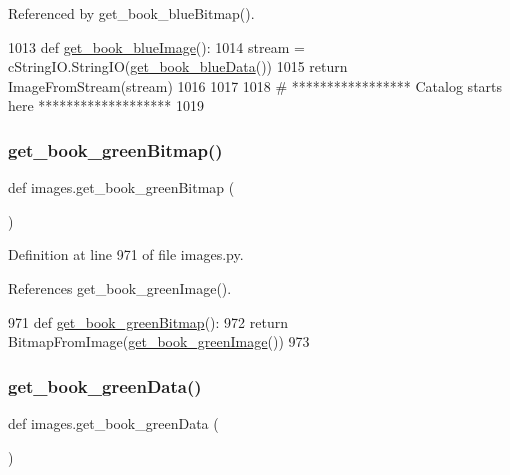 Referenced by get\+\_\+book\+\_\+blue\+Bitmap().


\begin{DoxyCode}
1013 \textcolor{keyword}{def }\hyperlink{namespaceimages_aec387bcd60dd97d588c6c8e1d8fc636a}{get\_book\_blueImage}():
1014     stream = cStringIO.StringIO(\hyperlink{namespaceimages_a9bec51464c6a49d85543696895516451}{get\_book\_blueData}())
1015     \textcolor{keywordflow}{return} ImageFromStream(stream)
1016 
1017 
1018 \textcolor{comment}{# ***************** Catalog starts here *******************}
1019 
\end{DoxyCode}
\mbox{\label{namespaceimages_a74775151671cf449130b4633d98fd269}} 
\subsubsection{\texorpdfstring{get\+\_\+book\+\_\+green\+Bitmap()}{get\_book\_greenBitmap()}}
{\footnotesize\ttfamily def images.\+get\+\_\+book\+\_\+green\+Bitmap (\begin{DoxyParamCaption}{ }\end{DoxyParamCaption})}



Definition at line 971 of file images.\+py.



References get\+\_\+book\+\_\+green\+Image().


\begin{DoxyCode}
971 \textcolor{keyword}{def }\hyperlink{namespaceimages_a74775151671cf449130b4633d98fd269}{get\_book\_greenBitmap}():
972     \textcolor{keywordflow}{return} BitmapFromImage(\hyperlink{namespaceimages_a2b9a8cbc20f7bf72e18cac42aff4dca7}{get\_book\_greenImage}())
973 
\end{DoxyCode}
\mbox{\label{namespaceimages_abfee1f116e5f3604f71862b5a039049b}} 
\subsubsection{\texorpdfstring{get\+\_\+book\+\_\+green\+Data()}{get\_book\_greenData()}}
{\footnotesize\ttfamily def images.\+get\+\_\+book\+\_\+green\+Data (\begin{DoxyParamCaption}{ }\end{DoxyParamCaption})}



